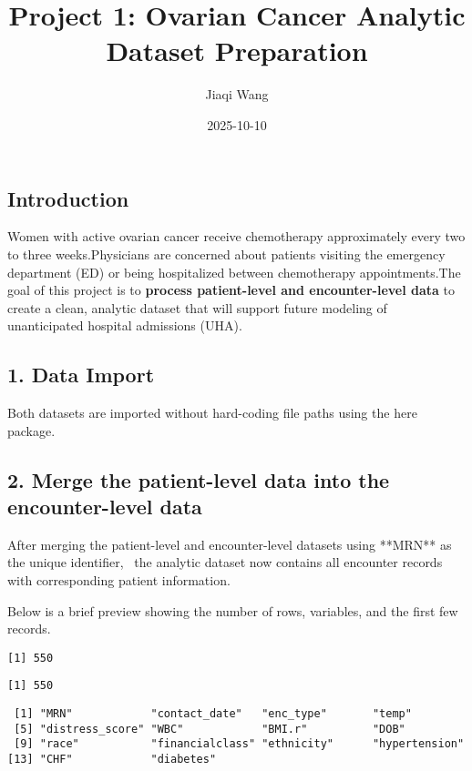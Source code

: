 \documentclass[
  letterpaper,
  DIV=11,
  numbers=noendperiod]{scrartcl}
\title{Project 1: Ovarian Cancer Analytic Dataset Preparation}
\author{Jiaqi Wang}
\date{2025-10-10}
\begin{document}
\maketitle


\subsection{Introduction}\label{introduction}

Women with active ovarian cancer receive chemotherapy approximately
every two to three weeks.Physicians are concerned about patients
visiting the emergency department (ED) or being hospitalized between
chemotherapy appointments.The goal of this project is to \textbf{process
patient-level and encounter-level data} to create a clean, analytic
dataset that will support future modeling of unanticipated hospital
admissions (UHA).

\subsection{1. Data Import}\label{data-import}

Both datasets are imported without hard-coding file paths using the here
package.

\subsection{2. Merge the patient-level data into the encounter-level
data}\label{merge-the-patient-level-data-into-the-encounter-level-data}

After merging the patient-level and encounter-level datasets using
**MRN** as the unique identifier, ~the analytic dataset now contains all
encounter records with corresponding patient information. ~

Below is a brief preview showing the number of rows, variables, and the
first few records.

\begin{verbatim}
[1] 550
\end{verbatim}

\begin{verbatim}
[1] 550
\end{verbatim}

\begin{verbatim}
 [1] "MRN"            "contact_date"   "enc_type"       "temp"          
 [5] "distress_score" "WBC"            "BMI.r"          "DOB"           
 [9] "race"           "financialclass" "ethnicity"      "hypertension"  
[13] "CHF"            "diabetes"      
\end{verbatim}
\end{document}
